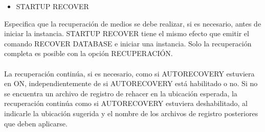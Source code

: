 \begin{itemize}
	\item STARTUP RECOVER  
\end{itemize}
\begin{adjustwidth}{0.40in}{0.0in}
	Especifica que la recuperación de medios se debe realizar, si es necesario, antes de iniciar la instancia. STARTUP RECOVER tiene el mismo efecto que emitir el comando RECOVER DATABASE e iniciar una instancia. Solo la recuperación completa es posible con la opción RECUPERACIÓN.\\ \\
	La recuperación continúa, si es necesario, como si AUTORECOVERY estuviera en ON, independientemente de si AUTORECOVERY está habilitado o no. Si no se encuentra un archivo de registro de rehacer en la ubicación esperada, la recuperación continúa como si AUTORECOVERY estuviera deshabilitado, al indicarle la ubicación sugerida y el nombre de los archivos de registro posteriores que deben aplicarse.\\
\\
\end{adjustwidth}


